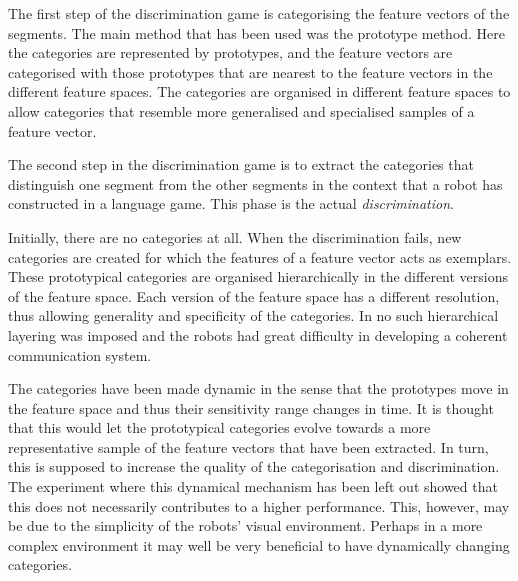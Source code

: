 The first step of the discrimination game is categorising the feature vectors of the segments. The main method that has been used was the prototype method. Here the categories are represented by prototypes, and the feature vectors are categorised with those prototypes that are nearest to the feature vectors in the different feature spaces. The categories are organised in different feature spaces to allow categories that resemble more generalised and specialised samples of a feature vector.

The second step in the discrimination game is to extract the categories that distinguish one segment from the other segments in the context that a robot has constructed in a language game. This phase is the actual {\em discrimination}.

Initially, there are no categories at all. When the discrimination fails, new categories are created for which the features of a feature vector acts as exemplars. These prototypical categories are organised hierarchically in the different versions of the feature space. Each version of the feature space has a different resolution, thus allowing generality and specificity of the categories. In \citep{dejongvogt:1998} no such hierarchical layering was imposed and the robots had great difficulty in developing a coherent communication system. 


The categories have been made dynamic in the sense that the prototypes move in the feature space and thus their sensitivity range changes in time. It is thought that this would let the prototypical categories evolve towards a more representative sample of the feature vectors that have been extracted. In turn, this is supposed to increase the quality of the categorisation and discrimination. The experiment where this dynamical mechanism has been left out showed that this does not necessarily contributes to a higher performance. This, however, may be due to the simplicity of the robots' visual environment. Perhaps in a more complex environment it may well be very beneficial to have dynamically changing categories.


